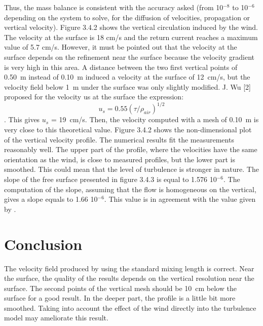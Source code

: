 Thus, the mass balance is consistent with the accuracy asked
(from 10$^{-8}$ to 10$^{-6}$ depending on the system to solve,
for the diffusion of velocities, propagation or vertical velocity).
Figure 3.4.2 shows the vertical circulation induced by the wind.
The velocity at the surface is 18 cm/s and the return current reaches
a maximum value of 5.7 cm/s.
However, it must be pointed out that the velocity at the surface depends
on the refinement near the surface because the velocity gradient is
very high in this area.
A distance between the two first vertical points of 0.50~m instead of
0.10~m induced a velocity at the surface of 12~cm/s, but the velocity
field below 1~m under the surface was only slightly modified.
J. Wu [2] proposed for the velocity us at the surface the expression:
\begin{equation}
u_s = 0.55 (\tau/\rho_{air})^{1/2}
\end{equation}.
This gives $u_s$ = 19~cm/s.
Then, the velocity computed with a mesh of 0.10~m is very close to
this theoretical value.
Figure 3.4.2 shows the non-dimensional plot of the vertical velocity
profile.
The numerical results fit the measurements reasonably well.
The upper part of the profile, where the velocities have the same
orientation as the wind, is close to measured profiles, but the lower
part is smoothed.
This could mean that the level of turbulence is stronger in nature.
The slope of the free surface presented in figure 3.4.3 is equal to
1.576 10$^{-6}$.
The computation of the slope, assuming that the flow is homogeneous on
the vertical, gives a slope equals to 1.66 10$^{-6}$.
This value is in agreement with the value given by .
%
\section{Conclusion}
%
The velocity field produced by  using the standard mixing
length is correct.
Near the surface, the quality of the results depends on the vertical
resolution near the surface.
The second points of the vertical mesh should be 10~cm below the surface
for a good result.
In the deeper part, the profile is a little bit more smoothed.
Taking into account the effect of the wind directly into the turbulence
model may ameliorate this result.
%
%
